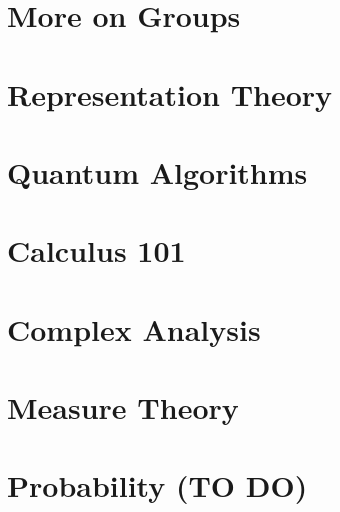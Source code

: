 \documentclass[11pt,twoside=semi,openright,numbers=noenddot,titlepage=false]{scrbook}
\begin{document}
\part{More on Groups}
\label{part:groups}
\parttoc




\part{Representation Theory}
\label{part:repth}
\parttoc





\part{Quantum Algorithms}
\label{part:quantum}
\parttoc




\part{Calculus 101}
\label{part:calc}
\parttoc






\part{Complex Analysis}
\label{part:cmplxana}
\parttoc





\part{Measure Theory}
\label{part:measure}
\parttoc






\part{Probability (TO DO)}
\label{part:prob}
\parttoc


\end{document}
